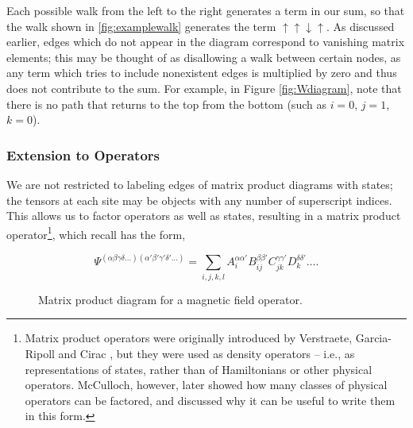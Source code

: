 \documentclass[12pt]{amsbook}
\theoremstyle{plain}
\theoremstyle{definition}
\theoremstyle{remark}
\begin{document}
Each possible walk from the left to the right generates a term in our sum, so that the walk shown in \ref{fig:examplewalk} generates the term $\uparrow\uparrow\downarrow\uparrow$.  As discussed earlier, edges which do not appear in the diagram correspond to vanishing matrix elements;  this may be thought of as disallowing a walk between certain nodes, as any term which tries to include nonexistent edges is multiplied by zero and thus does not contribute to the sum.  For example, in Figure \ref{fig:Wdiagram}, note that there is no path that returns to the top from the bottom (such as $i=0$, $j=1$, $k=0$).
\subsubsection{Extension to Operators}

We are not restricted to labeling edges of matrix product diagrams with states;  the tensors at each site may be objects with any number of superscript indices.  This allows us to factor operators as well as states, resulting in a matrix product operator\footnote{Matrix product operators were originally introduced by Verstraete, Garcia-Ripoll and Cirac \cite{cond-mat/0406426}, but they were used as density operators -- i.e., as representations of states, rather than of Hamiltonians or other physical operators.  McCulloch, however, later showed how many classes of physical operators can be factored, and discussed why it can be useful to write them in this form\cite{cond-mat/0701428}.}, which recall has the form,

$$\Psi^{(\alpha\beta\gamma\delta\dots)(\alpha'\beta'\gamma'\delta'\dots)} = \sum_{i,j,k,l} A_i^{\alpha\alpha'} B_{ij}^{\beta\beta'} C_{jk}^{\gamma\gamma'} D_{k}^{\delta\delta'} \dots.$$

\begin{figure}
\caption{Matrix product diagram for a magnetic field operator. \label{fig:magfield}}
\end{figure}
\end{document}

